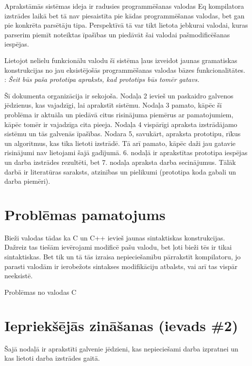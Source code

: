 \documentclass[12pt]{report}
\newcommand{\fixme}[1]{\vskip 5mm\noindent{\bf FIXME}: {\it #1}}
\begin{document}
Aprakstāmās sistēmas ideja ir radusies programmēšanas valodas Eq kompilatora izstrādes laikā bet tā nav piesaistīta pie kādas programmēšanas valodas, bet gan pie konkrēta parsētāju tipa. Perspektīvā tā var tikt lietota jebkurai valodai, kuras parserim piemīt noteiktas īpašības un piedāvāt šai valodai pašmodificēšanas iespējas.

Lietojot nelielu funkcionālu valodu šī sistēma ļaus izveidot jaunas gramatiskas konstrukcijas no jau eksistējošās programmēšanas valodas bāzes funkcionalitātes.
\fixme{Šeit būs paša prototipa apraksts, kad prototips būs tomēr gatavs.}


Šī dokumenta organizācija ir sekojoša. Nodaļa 2 ievieš un paskaidro galvenos jēdzienus, kas vajadzīgi, lai aprakstīt sistēmu. Nodaļa 3 pamato, kāpēc šī problēma ir aktuāla un piedāvā citus risinājuma piemērus ar pamatojumiem, kāpēc tomēr ir vajadzīga cita pieeja. Nodaļa 4 vispārīgi apraksta izstrādājamo sistēmu un tās galvenās īpašības. Nodara 5, savukārt, apraksta prototipu, rīkus un algoritmus, kas tika lietoti izstrādē. Tā arī pamato, kāpēc daži jau gatavie risinājumi nav lietojami šajā gadījumā. 6. nodaļā ir aprakstītas prototipa iespējas un darba izstrādes rezultēti, bet 7. nodaļa apraksta darba secinājumus. Tālāk darbā ir literatūras saraksts, atzinības un pielikumi (prototipa koda gabali un darba piemēri).

\section{Problēmas pamatojums}
Bieži valodas tādas ka C un C++ ievieš jaunas sintaktiskas konstrukcijas. Dažreiz tas tiešām ievērojami modificē pašu valodu, bet ļoti bieži tēs ir tikai sintaktiskas. Bet tik un tā tās izraisa nepieciešamību pārrakstīt kompilatoru, jo parasti valodām ir ierobežots sintakses modifikāciju atbalsts, vai arī tas vispār neeksistē.


Problēmas no valodas C

\section{Iepriekšējās zināšanas (ievads \#2)}
Šajā nodaļā ir aprakstīti galvenie jēdzieni, kas nepieciešami darba izpratnei un kas lietoti darba izstrādes gaitā. 
\end{document}
